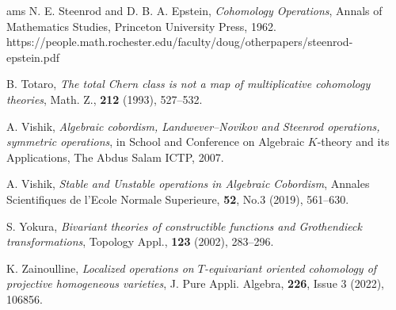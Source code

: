 \documentclass[a4paper]{amsart}
\begin{document}
\begin{thebibliography}{ams}
 N. E. Steenrod and D. B. A. Epstein, {\it Cohomology Operations}, Annals of Mathematics Studies, Princeton University Press, 1962.
https://people.math.rochester.edu/faculty/doug/otherpapers/steenrod-epstein.pdf

 B. Totaro, {\it The total Chern class is not a map of multiplicative cohomology theories}, 
Math. Z., {\bf 212} (1993), 527--532.

 A. Vishik, {\it Algebraic cobordism, Landwever--Novikov and Steenrod operations, symmetric operations}, in School and Conference on Algebraic $K$-theory and its Applications, The Abdus Salam ICTP, 2007.

 A. Vishik, {\it Stable and Unstable operations in Algebraic Cobordism},  Annales Scientifiques de l'Ecole Normale Superieure, {\bf 52}, No.3 (2019), 561--630.

 S. Yokura, {\it Bivariant theories of constructible functions and Grothendieck transformations}, Topology Appl.,  {\bf 123} (2002), 283--296.

 K. Zainoulline, {\it Localized operations on $T$-equivariant oriented cohomology of projective homogeneous varieties}, J. Pure Appli. Algebra, {\bf 226}, Issue 3 (2022), 106856.


\end{thebibliography}
\end{document}
